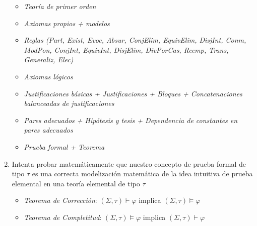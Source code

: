 \documentclass{article}
\begin{document}
\begin{enumerate}
\begin{itemize}
          \item \textit{Teoría de primer orden}
          \item \textit{Axiomas propios + modelos}
          \item \textit{Reglas (Part, Exist, Evoc, Absur, ConjElim, EquivElim, DisjInt, Conm, ModPon, ConjInt, EquivInt, DisjElim, DivPorCas, Reemp, Trans, Generaliz, Elec)}
          \item \textit{Axiomas lógicos}
          \item \textit{Justificaciones básicas + Justificaciones + Bloques + Concatenaciones balanceadas de justificaciones}
          \item \textit{Pares adecuados + Hipótesis y tesis + Dependencia de constantes en pares adecuados}
          \item \textit{Prueba formal + Teorema}
        \end{itemize}
  \item Intenta probar matemáticamente que nuestro concepto de prueba formal de tipo $\tau$ es una correcta modelización matemática de la idea intuitiva de prueba elemental en una teoría elemental de tipo $\tau$
        \begin{itemize}
          \item \textit{Teorema de Corrección}: $(\Sigma,\tau)\vdash\varphi$ implica $(\Sigma,\tau)\vDash\varphi$
          \item \textit{Teorema de Completitud}: $(\Sigma,\tau)\vDash\varphi$ implica $(\Sigma,\tau)\vdash\varphi$
        \end{itemize}
\end{enumerate}
\end{document}

